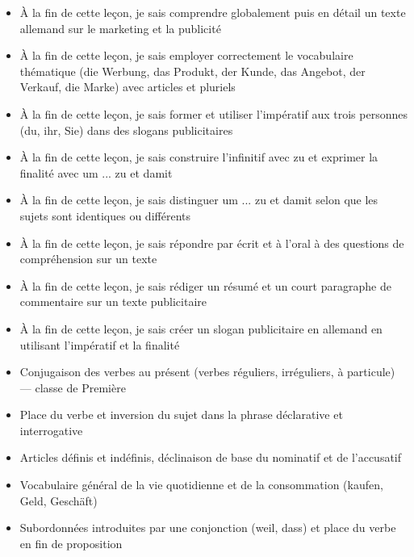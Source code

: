 \documentclass[11pt]{article}
\begin{document}
\begin{objectifs}
\begin{itemize}
\item À la fin de cette leçon, je sais comprendre globalement puis en détail un texte allemand sur le marketing et la publicité
\item À la fin de cette leçon, je sais employer correctement le vocabulaire thématique (die Werbung, das Produkt, der Kunde, das Angebot, der Verkauf, die Marke) avec articles et pluriels
\item À la fin de cette leçon, je sais former et utiliser l'impératif aux trois personnes (du, ihr, Sie) dans des slogans publicitaires
\item À la fin de cette leçon, je sais construire l'infinitif avec zu et exprimer la finalité avec um ... zu et damit
\item À la fin de cette leçon, je sais distinguer um ... zu et damit selon que les sujets sont identiques ou différents
\item À la fin de cette leçon, je sais répondre par écrit et à l'oral à des questions de compréhension sur un texte
\item À la fin de cette leçon, je sais rédiger un résumé et un court paragraphe de commentaire sur un texte publicitaire
\item À la fin de cette leçon, je sais créer un slogan publicitaire en allemand en utilisant l'impératif et la finalité
\end{itemize}
\end{objectifs}

\begin{prerequis}
\begin{itemize}
\item Conjugaison des verbes au présent (verbes réguliers, irréguliers, à particule) — classe de Première
\item Place du verbe et inversion du sujet dans la phrase déclarative et interrogative
\item Articles définis et indéfinis, déclinaison de base du nominatif et de l'accusatif
\item Vocabulaire général de la vie quotidienne et de la consommation (kaufen, Geld, Geschäft)
\item Subordonnées introduites par une conjonction (weil, dass) et place du verbe en fin de proposition
\end{itemize}
\end{prerequis}

\newpage
\end{document}
